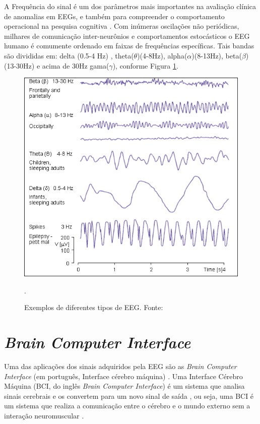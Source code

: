 A Frequência do sinal é um dos parâmetros mais importantes na avaliação clínica de anomalias em EEGs, e também para compreender o comportamento operacional na pesquisa cognitiva \cite{SIULYDissertacao}.
Com inúmeras oscilações não periódicas, milhares de comunicação inter-neurônios e comportamentos estocásticos o EEG humano é comumente ordenado  em faixas de frequências específicas. Tais bandas são divididas em: delta
 (0.5-4 Hz) , theta($\theta$)(4-8Hz), alpha($\alpha$)(8-13Hz), beta($\beta$)(13-30Hz) e acima de 30Hz gama($\gamma$), conforme Figura \ref{EEGcomun}.
 \newline

\begin{figure}[h]
	\centering
	\includegraphics[keepaspectratio=true,scale=0.75]{figuras/formas_EEG.PNG}
	\caption{Exemplos de diferentes tipos de EEG. Fonte: \cite{campisi2012eeg}}.
	\label{EEGcomun}
\end{figure}


\section{\textit{Brain Computer Interface}}

Uma das aplicações dos sinais adquiridos pela EEG são as \textit{Brain Computer Interface} (em português, Interface cérebro máquina) \cite{F.Lotte, SIULYDissertacao}. Uma Interface Cérebro Máquina (BCI, do inglês \textit{Brain Computer Interface}) é um sistema que analisa sinais cerebrais e os convertem para um novo sinal de saída \cite{BCIWolpaw}, ou seja, uma BCI é um sistema que realiza a comunicação entre o cérebro e o mundo externo sem a interação neuromuscular \cite{BCIWolpaw}.

